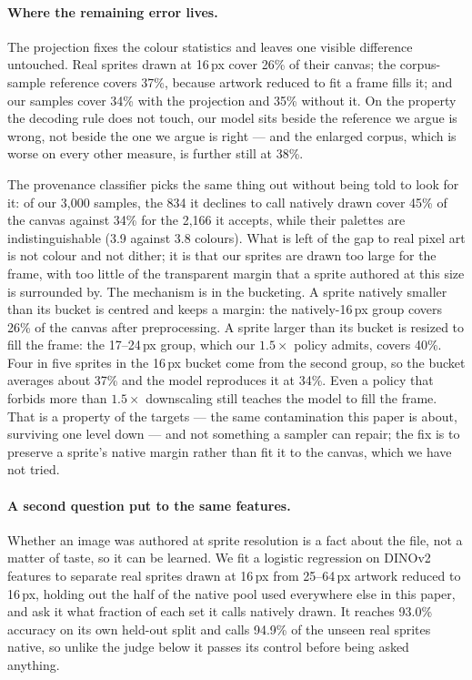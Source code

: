 \documentclass[10pt,twocolumn,letterpaper]{article}
\begin{document}
\paragraph{Where the remaining error lives.}
The projection fixes the colour statistics and leaves one visible difference untouched. Real sprites drawn at 16\,px
cover 26\% of their canvas; the corpus-sample reference covers 37\%, because artwork reduced to fit a frame fills it;
and our samples cover 34\% with the projection and 35\% without it. On the property the decoding rule does not touch,
our model sits beside the reference we argue is wrong, not beside the one we argue is right --- and the enlarged
corpus, which is worse on every other measure, is further still at 38\%.

The provenance classifier picks the same thing out without being told to look for it: of our 3{,}000 samples, the 834
it declines to call natively drawn cover 45\% of the canvas against 34\% for the 2{,}166 it accepts, while their
palettes are indistinguishable (3.9 against 3.8 colours). What is left of the gap to real pixel art is not colour and
not dither; it is that our sprites are drawn too large for the frame, with too little of the transparent margin that a
sprite authored at this size is surrounded by. The mechanism is in the bucketing. A sprite natively smaller than its bucket is centred and keeps a margin: the
natively-16\,px group covers 26\% of the canvas after preprocessing. A sprite larger than its bucket is resized to
fill the frame: the 17--24\,px group, which our $1.5\times$ policy admits, covers 40\%. Four in five sprites in the
16\,px bucket come from the second group, so the bucket averages about 37\% and the model reproduces it at 34\%.
Even a policy that forbids more than $1.5\times$ downscaling still teaches the model to fill the frame. That is a
property of the targets --- the same contamination this paper is about, surviving one level down --- and not
something a sampler can repair; the fix is to preserve a sprite's native margin rather than fit it to the canvas,
which we have not tried.

\paragraph{A second question put to the same features.}
Whether an image was authored at sprite resolution is a fact about the file, not a matter of taste, so it can be
learned. We fit a logistic regression on DINOv2 features to separate real sprites drawn at 16\,px from 25--64\,px
artwork reduced to 16\,px, holding out the half of the native pool used everywhere else in this paper, and ask it what
fraction of each set it calls natively drawn. It reaches 93.0\% accuracy on its own held-out split and calls 94.9\% of
the unseen real sprites native, so unlike the judge below it passes its control before being asked anything.
\end{document}
